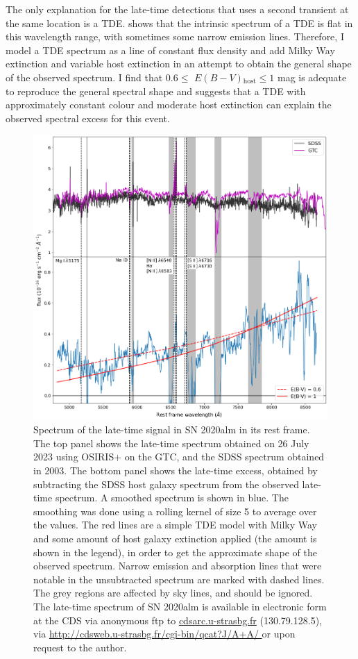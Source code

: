 \documentclass[a4paper,oneside,12pt, class=Latex/Classes/PhDthesisPSnPDF, crop=false]{standalone}
\begin{document}
The only explanation for the late-time detections that uses a second transient at the same location is a TDE. \citet{TDE_host_ext_range} shows that the intrinsic spectrum of a TDE is flat in this wavelength range, with sometimes some narrow emission lines. Therefore, I model a TDE spectrum as a line of constant flux density and add Milky Way extinction \citep[using the SFD89 dust maps in the direction of the object; ][]{SFD98_dust_maps} and variable host extinction in an attempt to obtain the general shape of the observed spectrum. I find that $0.6\leq$ $E(B - V)$$_\text{host}\leq1$ mag is adequate to reproduce the general spectral shape and suggests that a TDE with approximately constant colour and moderate host extinction can explain the observed spectral excess for this event.

\begin{figure}
 \centering
 \includegraphics[width=\textwidth]{../Images/chapter_3/spec_obj.png}
 \caption{Spectrum of the late-time signal in SN 2020alm in its rest frame. The top panel shows the late-time spectrum obtained on 26 July 2023 using OSIRIS+ on the GTC, and the SDSS spectrum obtained in 2003. The bottom panel shows the late-time excess, obtained by subtracting the SDSS host galaxy spectrum from the observed late-time spectrum. A smoothed spectrum is shown in blue. The smoothing was done using a rolling kernel of size 5 to average over the values. The red lines are a simple TDE model with Milky Way and some amount of host galaxy extinction applied (the amount is shown in the legend), in order to get the approximate shape of the observed spectrum. Narrow emission and absorption lines that were notable in the unsubtracted spectrum are marked with dashed lines. The grey regions are affected by sky lines, and should be ignored. The late-time spectrum of SN 2020alm is available in electronic form at the CDS via anonymous ftp to \url{cdsarc.u-strasbg.fr} (130.79.128.5), via \url{http://cdsweb.u-strasbg.fr/cgi-bin/qcat?J/A+A/ }or upon request to the author.}
 \label{ZTF20aaifyfx_spec}
\end{figure}
\end{document}

